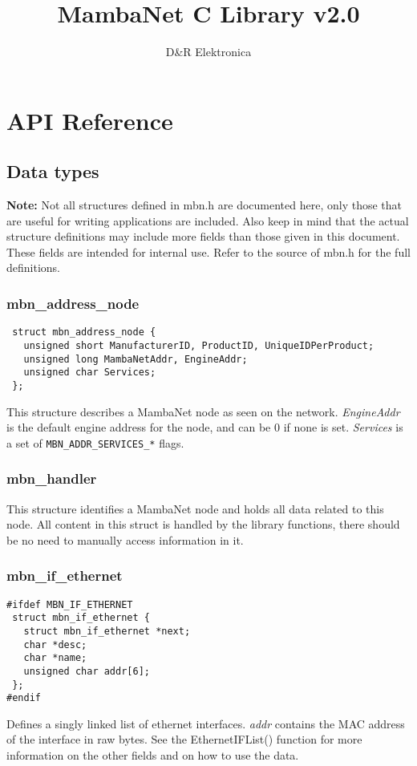\documentclass[a4paper]{report}
\begin{document}
\title{MambaNet C Library v2.0}
\author{D\&R Elektronica}
\maketitle

\setcounter{tocdepth}{1}
\tableofcontents
\setcounter{tocdepth}{2}


\chapter{API Reference}
\section{Data types}
\textbf{Note:} Not all structures defined in mbn.h are documented here, only those that are useful for writing applications are included. Also keep in mind that the actual structure definitions may include more fields than those given in this document. These fields are intended for internal use. Refer to the source of mbn.h for the full definitions.


\subsection{mbn\_address\_node}
\begin{verbatim}
 struct mbn_address_node {
   unsigned short ManufacturerID, ProductID, UniqueIDPerProduct;
   unsigned long MambaNetAddr, EngineAddr;
   unsigned char Services;
 };
\end{verbatim}
This structure describes a MambaNet node as seen on the network. \textit{EngineAddr} is the default engine address for the node, and can be 0 if none is set. \textit{Services} is a set of \verb|MBN_ADDR_SERVICES_*| flags.


\subsection{mbn\_handler}
This structure identifies a MambaNet node and holds all data related to this node. All content in this struct is handled by the library functions, there should be no need to manually access information in it.


\subsection{mbn\_if\_ethernet}
\begin{verbatim}
#ifdef MBN_IF_ETHERNET
 struct mbn_if_ethernet {
   struct mbn_if_ethernet *next;
   char *desc;
   char *name;
   unsigned char addr[6];
 };
#endif
\end{verbatim}
Defines a singly linked list of ethernet interfaces. \textit{addr} contains the MAC address of the interface in raw bytes. See the EthernetIFList() function for more information on the other fields and on how to use the data.
\end{document}
